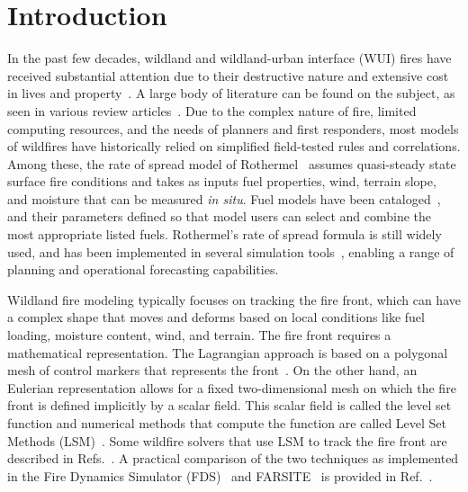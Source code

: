 \documentclass[journal,article,atmosphere,submit,moreauthors,pdftex]{Definitions/mdpi}
\begin{document}
\section{Introduction}

In the past few decades, wildland and wildland-urban interface (WUI) fires have received substantial attention due to their destructive nature and extensive cost in lives and property~\cite{thomas_2017,mcdermott_2019,richards_2020}. A large body of literature can be found on the subject, as seen in various review articles~\cite{Papadopoulos_2011,Bakhshaii_2019,mcdermott_2019}. Due to the complex nature of fire, limited computing resources, and the needs of planners and first responders, most models of wildfires have historically relied on simplified field-tested rules and correlations. Among these, the rate of spread model of Rothermel~\cite{Rothermel:1972} assumes quasi-steady state surface fire conditions and takes as inputs fuel properties, wind, terrain slope, and moisture that can be measured {\em in situ}. Fuel models have been cataloged~\cite{Anderson:1982}, and their parameters defined so that model users can select and combine the most appropriate listed fuels. Rothermel's rate of spread formula is still widely used, and has been implemented in several simulation tools~\cite{Finney:FARSITE,Bova:IJWF2015,FDS_Users_Guide,Coen:2,Coen:2015,LAUTENBERGER_2013,Coen:2013,Mandel:2009,Mandel:2011,Mandel:2014,Kochanski:2016}, enabling a range of planning and operational forecasting capabilities.

Wildland fire modeling typically focuses on tracking the fire front, which can have a complex shape that moves and deforms based on local conditions like fuel loading, moisture content, wind, and terrain. The fire front requires a mathematical representation. The Lagrangian approach is based on a polygonal mesh of control markers that represents the front~\cite{Finney:FARSITE,Bova:IJWF2015}. On the other hand, an Eulerian representation allows for a fixed two-dimensional mesh on which the fire front is defined implicitly by a scalar field. This scalar field is called the level set function and numerical methods that compute the function are called Level Set Methods (LSM)~\cite{Sethian:1999,Osher:2006}. Some wildfire solvers that use LSM to track the fire front are described in Refs.~\cite{coen_2013,Bova:IJWF2015,FDS_Users_Guide,LAUTENBERGER_2013}. A practical comparison of the two techniques as implemented in the Fire Dynamics Simulator (FDS)~\cite{Mell:IJWF2007} and FARSITE~\cite{Finney:FARSITE} is provided in Ref.~\cite{Bova:IJWF2015}.
\end{document}

